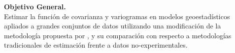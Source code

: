 \noindent\textbf{Objetivo General.} \\
\indent Estimar la funci\'on de covarianza y variogramas en modelos geoestad\'isticos apliados a grandes conjuntos de datos utilizando una modificaci\'on de la metodolog\'ia propuesta por , y su comparaci\'on con respecto a metodolog\'ias tradicionales de estimaci\'on frente a datos no-experimentales.\\
\

\vfill
